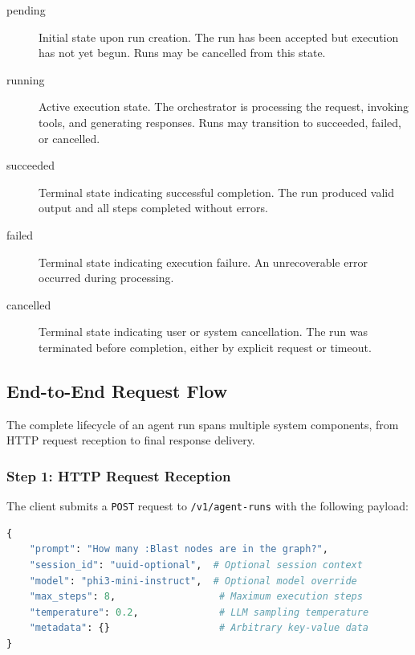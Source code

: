 \documentclass[a4paper,twoside]{sapthesis}
\begin{document}
\begin{description}
    \item[pending] Initial state upon run creation. The run has been accepted but execution has not yet begun. Runs may be cancelled from this state.
    
    \item[running] Active execution state. The orchestrator is processing the request, invoking tools, and generating responses. Runs may transition to succeeded, failed, or cancelled.
    
    \item[succeeded] Terminal state indicating successful completion. The run produced valid output and all steps completed without errors.
    
    \item[failed] Terminal state indicating execution failure. An unrecoverable error occurred during processing.
    
    \item[cancelled] Terminal state indicating user or system cancellation. The run was terminated before completion, either by explicit request or timeout.
\end{description}

\subsection{End-to-End Request Flow}

The complete lifecycle of an agent run spans multiple system components, from HTTP request reception to final response delivery.

\subsubsection{Step 1: HTTP Request Reception}

The client submits a \texttt{POST} request to \texttt{/v1/agent-runs} with the following payload:

\begin{lstlisting}[language=Python, caption={Agent run request payload}, label=lst:run-request]
{
    "prompt": "How many :Blast nodes are in the graph?",
    "session_id": "uuid-optional",  # Optional session context
    "model": "phi3-mini-instruct",  # Optional model override
    "max_steps": 8,                  # Maximum execution steps
    "temperature": 0.2,              # LLM sampling temperature
    "metadata": {}                   # Arbitrary key-value data
}
\end{lstlisting}
\end{document}
